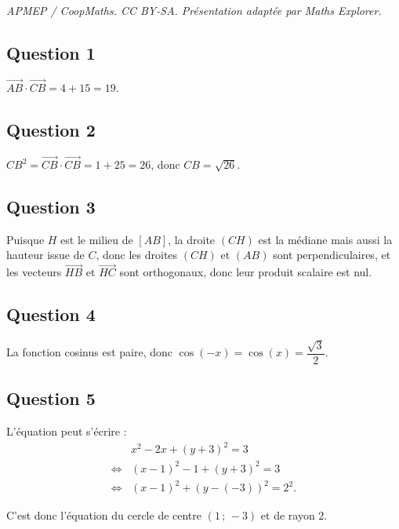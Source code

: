 \documentclass[10pt]{article}
\begin{document}
\noindent\textit{APMEP / CoopMaths. CC BY-SA. Présentation adaptée par Maths Explorer.}\par\medskip
\subsection*{Question 1}

\(\overrightarrow{AB} \cdot \overrightarrow{CB} = 4 + 15 = 19\).

\subsection*{Question 2}

\(CB^2 = \overrightarrow{CB} \cdot \overrightarrow{CB} = 1 + 25 = 26\), donc \(CB = \sqrt{26}\).

\subsection*{Question 3}

Puisque \( H \) est le milieu de \( [AB] \), la droite \( (CH) \) est la médiane mais aussi la hauteur issue de \( C \), donc les droites \( (CH) \) et \( (AB) \) sont perpendiculaires, et les vecteurs \( \overrightarrow{HB} \) et \( \overrightarrow{HC} \) sont orthogonaux, donc leur produit scalaire est nul.

\subsection*{Question 4}

La fonction cosinus est paire, donc \( \cos(-x) = \cos(x) = \dfrac{\sqrt{3}}{2} \).

\subsection*{Question 5}

L'équation peut s'écrire :
\begin{align*}
&x^2 - 2x + (y + 3)^2 = 3 \\
\iff &(x - 1)^2 - 1 + (y + 3)^2 = 3 \\
\iff &(x - 1)^2 + (y - (-3))^2 = 2^2.
\end{align*}

C'est donc l'équation du cercle de centre \( (1\,;\,-3) \) et de rayon 2.
\end{document}
